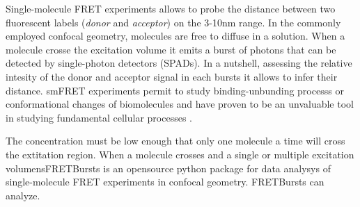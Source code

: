 
Single-molecule FRET experiments allows to probe the distance between two fluorescent labels (\textit{donor} and \textit{acceptor}) on the 3-10nm range. In the commonly employed confocal geometry, molecules are free to diffuse in a solution. When a molecule crosse the excitation volume it emits a burst of photons that can be detected by single-photon detectors (SPADs). In a nutshell, assessing the relative intesity of the donor and acceptor signal in each bursts it allows to infer their distance. smFRET experiments permit to study binding-unbunding processs or conformational changes of biomolecules and have proven to be an unvaluable tool in studying fundamental cellular processes \cite{Kapanidis_2006}.

The concentration must be low enough that only one molecule a time will cross the extitation region. When a molecule crosses and a single or multiple excitation volumensFRETBursts is an opensource python package for data analysys of single-molecule FRET experiments in confocal geometry. FRETBursts can analyze.
